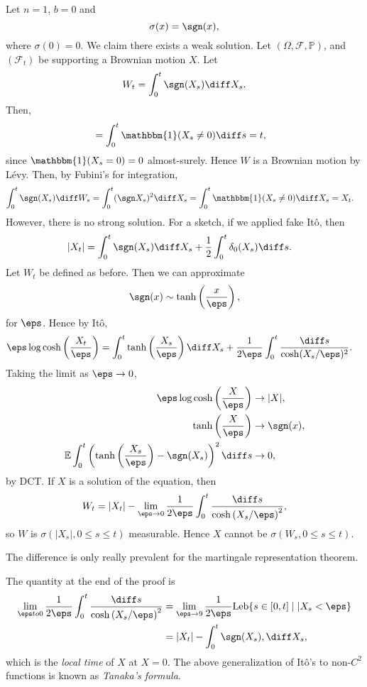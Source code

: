 \documentclass[12pt]{article}
\begin{document}
\begin{exbox}
	Let $n = 1$, $b = 0$ and
	\[
	\sigma(x) = \sgn (x),
	\]
	where $\sigma(0) = 0$. We claim there exists a weak solution. Let $(\Omega, \mathcal{F}, \mathbb{P})$, and $(\mathcal{F}_t)$ be supporting a Brownian motion $X$. Let
	\[
	W_t = \int_0^{t} \sgn(X_s) \diff X_s.
	\]
	Then,
	\begin{align*}
		[W] &= \int_0^{t} \mathbbm{1}(X_s \neq 0) \diff s = t,
	\end{align*}
	since $\mathbbm{1}(X_s = 0) = 0$ almost-surely. Hence $W$ is a Brownian motion by L\'evy. Then, by Fubini's for integration,
	\begin{align*}
		\int_0^{t} \sgn(X_s) \diff W_s &= \int_0^{t} (\sgn X_s)^2 \diff X_s = \int_0^{t} \mathbbm{1}(X_s \neq 0) \diff X_s = X_t.
	\end{align*}
	However, there is no strong solution. For a sketch, if we applied fake It\^o, then
	\begin{align*}
		|X_t| &= \int_0^{t} \sgn(X_s) \diff X_s + \frac 12 \int_0^{t} \delta_0(X_s) \diff s.
	\end{align*}
	Let $W_t$ be defined as before. Then we can approximate
	\[
	\sgn(x) \sim \tanh \left( \frac x\eps \right),
	\]
	for $\eps$. Hence by It\^o,
	\begin{align*}
		\eps \log \cosh \left( \frac{X_t}{\eps} \right) &= \int_0^{t} \tanh \left( \frac{X_s}{\eps} \right) \diff X_s + \frac1{2\eps} \int_0^{t} \frac{\diff s}{ \cosh(X_s/\eps)^2}.
	\end{align*}
	Taking the limit as $\eps \to 0$,
	\begin{align*}
		\eps \log \cosh \left( \frac{X}{\eps} \right) &\to |X|, \\
		\tanh \left( \frac X\eps \right) &\to \sgn(x), \\
		\mathbb{E} \int_0^{t} \left( \tanh \left( \frac{X_s}{\eps} \right) - \sgn(X_s) \right)^2 \diff s & \to 0,
	\end{align*}
	by DCT. If $X$ is a solution of the equation, then
	\[
	W_t = |X_t| - \lim_{\eps \to 0} \frac{1}{2 \eps} \int_0^{t} \frac{\diff s}{\cosh \left( X_s/\eps \right)^2},
	\]
	so $W$ is $\sigma(|X_s|, 0 \leq s \leq t)$ measurable. Hence $X$ cannot be $\sigma(W_s, 0 \leq s \leq t)$.
\end{exbox}

The difference is only really prevalent for the martingale representation theorem.

The quantity at the end of the proof is
\begin{align*}
	\lim_{\eps to 0} \frac{1}{2 \eps} \int_0^{t} \frac{\diff s}{ \cosh \left( X_s / \eps \right)^2} &= \lim_{\eps \to 9} \frac{1}{2 \eps} \mathrm{Leb} \{ s \in [0, t] \mid |X_s < \eps \} \\
													&= |X_t| - \int_0^{t} \sgn(X_s), \diff X_s,
\end{align*}
which is the \emph{local time} of $X$ at $X = 0$. The above generalization of It\^o's to non-$C^2$ functions is known as \emph{Tanaka's formula}.
\end{document}
